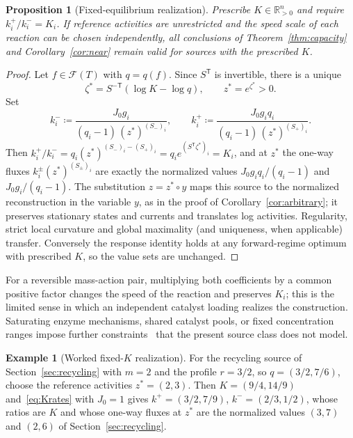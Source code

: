 \documentclass[11pt,a4paper]{article}
\theoremstyle{plain}
\newtheorem{proposition}[theorem]{Proposition}
\theoremstyle{definition}
\newtheorem{example}[theorem]{Example}
\theoremstyle{remark}
\numberwithin{equation}{section}
\newcommand{\R}{\mathbb{R}}
\newcommand{\T}{\mathsf{T}}
\newcommand{\Sp}{S_{+}}
\newcommand{\Sm}{S_{-}}
\newcommand{\cone}{\mathcal{F}}
\renewcommand{\odot}{\circ}
\begin{document}
\begin{proposition}[Fixed-equilibrium realization]\label{prop:fixedK}
Prescribe $K\in\R^n_{>0}$ and require $k^+_i/k^-_i=K_i$. If reference activities are unrestricted and the speed scale of each reaction can be chosen independently, all conclusions of Theorem~\ref{thm:capacity} and Corollary~\ref{cor:near} remain valid for sources with the prescribed $K$.
\end{proposition}
\begin{proof}
Let $f\in\cone(T)$ with $q=q(f)$. Since $S^{\T}$ is invertible, there is a unique
\begin{equation}\label{eq:Kstate}
 \zeta^*=S^{-\T}(\log K-\log q),\qquad z^*=e^{\zeta^*}>0 .
\end{equation}
Set
\begin{equation}\label{eq:Krates}
 k^-_i\coloneqq\frac{J_0g_i}{(q_i-1)\,(z^*)^{(\Sm)_i}},\qquad
 k^+_i\coloneqq\frac{J_0g_iq_i}{(q_i-1)\,(z^*)^{(\Sp)_i}} .
\end{equation}
Then $k^+_i/k^-_i=q_i(z^*)^{(\Sm)_i-(\Sp)_i}=q_ie^{(S^{\T}\zeta^*)_i}=K_i$, and at $z^*$ the one-way fluxes $k^\pm_i(z^*)^{(S_\pm)_i}$ are exactly the normalized values $J_0g_iq_i/(q_i-1)$ and $J_0g_i/(q_i-1)$. The substitution $z=z^*\odot y$ maps this source to the normalized reconstruction in the variable $y$, as in the proof of Corollary~\ref{cor:arbitrary}; it preserves stationary states and currents and translates log activities. Regularity, strict local curvature and global maximality (and uniqueness, when applicable) transfer. Conversely the response identity holds at any forward-regime optimum with prescribed $K$, so the value sets are unchanged.
\end{proof}

For a reversible mass-action pair, multiplying both coefficients by a common positive factor changes the speed of the reaction and preserves $K_i$; this is the limited sense in which an independent catalyst loading realizes the construction. Saturating enzyme mechanisms, shared catalyst pools, or fixed concentration ranges impose further constraints~\citep{wachtel2018,noor2016} that the present source class does not model.

\begin{example}[Worked fixed-$K$ realization]\label{ex:fixedK}
For the recycling source of Section~\ref{sec:recycling} with $m=2$ and the profile $r=3/2$, so $q=(3/2,7/6)$, choose the reference activities $z^*=(2,3)$. Then $K=(9/4,14/9)$ and~\eqref{eq:Krates} with $J_0=1$ gives $k^+=(3/2,7/9)$, $k^-=(2/3,1/2)$, whose ratios are $K$ and whose one-way fluxes at $z^*$ are the normalized values $(3,7)$ and $(2,6)$ of Section~\ref{sec:recycling}.
\end{example}
\end{document}
